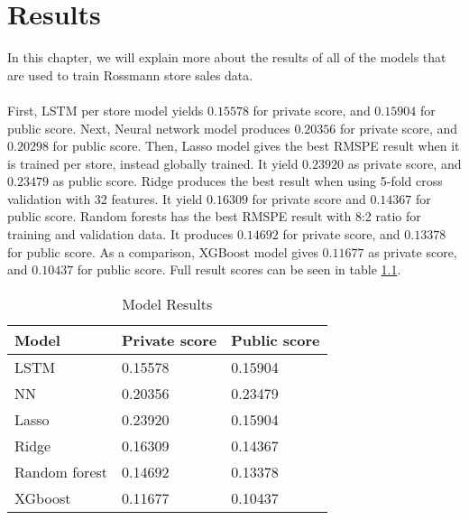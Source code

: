 \chapter{Results}
In this chapter, we will explain more about the results of all of the models that are used to train Rossmann store sales data. \\ \\
First, LSTM per store model yields $0.15578$ for private score, and $0.15904$ for public score. Next, Neural network model produces $0.20356$ for private score, and $0.20298$ for public score. Then, Lasso model gives the best RMSPE result when it is trained per store, instead globally trained. It yield $0.23920$ as private score, and $0.23479$ as public score. Ridge produces the best result when using 5-fold cross validation with 32 features. It yield $0.16309$ for private score and $0.14367$ for public score. Random forests has the best RMSPE result with 8:2 ratio for training and validation data. It produces $0.14692$ for private score, and $0.13378$ for public score. As a comparison, XGBoost model gives $0.11677$ as private score, and $0.10437$ for public score. Full result scores can be seen in table \ref{tab:result}.

\begin{table}[H]
	\centering
	\caption{Model Results}
	\label{tab:result}
	\begin{tabular}{|m{200pt}|m{100pt}|m{100pt}|}
		\hline
		Model & Private score & Public score \\ \hline
		LSTM & 0.15578 & 0.15904 \\ \hline
		NN & 0.20356 & 0.23479 \\ \hline
		Lasso & 0.23920 & 0.15904 \\ \hline
		Ridge & 0.16309 & 0.14367 \\ \hline
		Random forest & 0.14692 & 0.13378 \\ \hline
		XGboost & 0.11677 & 0.10437 \\ \hline
	\end{tabular}
\end{table}